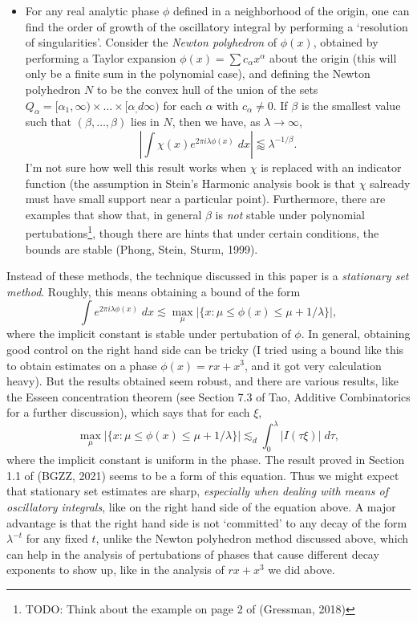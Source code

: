 \begin{itemize}
	\item For any real analytic phase $\phi$ defined in a neighborhood of the origin, one can find the order of growth of the oscillatory integral by performing a `resolution of singularities'. Consider the \emph{Newton polyhedron} of $\phi(x)$, obtained by performing a Taylor expansion $\phi(x) = \sum c_\alpha x^\alpha$ about the origin (this will only be a finite sum in the polynomial case), and defining the Newton polyhedron $N$ to be the convex hull of the union of the sets $Q_\alpha = [\alpha_1, \infty) \times \dots \times [\alpha_,d \infty)$ for each $\alpha$ with $c_\alpha \neq 0$. If $\beta$ is the smallest value such that $(\beta,\dots,\beta)$ lies in $N$, then we have, as $\lambda \to \infty$,
	\[ \left| \int \chi(x) e^{2 \pi i \lambda \phi(x)}\; dx \right| \lessapprox \lambda^{-1/\beta}. \]
	I'm not sure how well this result works when $\chi$ is replaced with an indicator function (the assumption in Stein's Harmonic analysis book is that $\chi$ salready must have small support near a particular point). Furthermore, there are examples that show that, in general $\beta$ is \emph{not} stable under polynomial pertubations\footnote{TODO: Think about the example on page 2 of (Gressman, 2018)}, though there are hints that under certain conditions, the bounds are stable (Phong, Stein, Sturm, 1999).
\end{itemize}
%
Instead of these methods, the technique discussed in this paper is a \emph{stationary set method}. Roughly, this means obtaining a bound of the form
%
\[ \int e^{2 \pi i \lambda \phi(x)}\; dx \lesssim \max_{\mu} \Big| \{ x : \mu \leq \phi(x) \leq \mu + 1/\lambda \} \Big|, \]
%
where the implicit constant is stable under pertubation of $\phi$. In general, obtaining good control on the right hand side can be tricky (I tried using a bound like this to obtain estimates on a phase $\phi(x) = rx + x^3$, and it got very calculation heavy). But the results obtained seem robust, and there are various results, like the Esseen concentration theorem (see Section 7.3 of Tao, Additive Combinatorics for a further discussion), which says that for each $\xi$,
%
\[ \max_\mu \Big| \{ x : \mu \leq \phi(x) \leq \mu + 1/\lambda \} \Big| \lesssim_d \int_0^{\lambda} |I(\tau \xi)|\; d\tau, \]
%
where the implicit constant is uniform in the phase. The result proved in Section 1.1 of (BGZZ, 2021) seems to be a form of this equation. Thus we might expect that stationary set estimates are sharp, \emph{especially when dealing with means of oscillatory integrals}, like on the right hand side of the equation above. A major advantage is that the right hand side is not `committed' to any decay of the form $\lambda^{-t}$ for any fixed $t$, unlike the Newton polyhedron method discussed above, which can help in the analysis of pertubations of phases that cause different decay exponents to show up, like in the analysis of $rx + x^3$ we did above.

